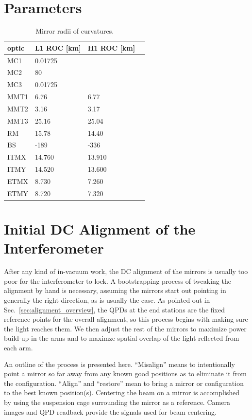 \section{Parameters}
\begin{table}
\centering
\caption{Mirror radii of curvatures.} 
\begin{tabular}{l l l l}
\hline
optic & L1 ROC [km] & H1 ROC [km] \\
\hline
MC1 & 0.01725 & \\
MC2 & 80 & \\ 
MC3 & 0.01725 & \\ 
MMT1 & 6.76 & 6.77 \\
MMT2 & 3.16 & 3.17 \\
MMT3 & 25.16 & 25.04\\
RM & 15.78 & 14.40 \\
BS & -189 & -336 \\
ITMX & 14.760 & 13.910 \\ 
ITMY & 14.520 & 13.600 \\
ETMX & 8.730 & 7.260 \\
ETMY & 8.720 & 7.320 \\
\hline
\end{tabular}
\label{tab:ROCs}
\end{table} 



\section{Initial DC Alignment of the Interferometer}
\label{sec:initial_alignment}
After any kind of in-vacuum work, the DC alignment of the mirrors is
usually too poor for the interferometer to lock. A bootstrapping
process of tweaking the alignment by hand is necessary, assuming the
mirrors start out pointing in generally the right direction, as is
usually the case. As pointed out in Sec.~\ref{sec:alignment_overview}, the
QPDs at the end stations are the fixed reference points for the
overall alignment, so this process begins with making sure the light
reaches them. We then adjust the rest of the mirrors to maximize power
build-up in the arms and to maximze spatial overlap of the light
reflected from each arm.

An outline of the process is presented here. ``Misalign'' means to
intentionally point a mirror so far away from any known good positions
as to eliminate it from the configuration.  ``Align'' and ``restore''
mean to bring a mirror or configuration to the best known
position(s). Centering the beam on a mirror is accomplished by using
the suspension cage surrounding the mirror as a reference. Camera
images and QPD readback provide the signals used for beam centering. 

